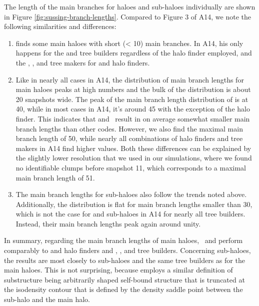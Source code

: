 The length of the main branches for haloes and sub-haloes individually are shown in Figure
\ref{fig:sussing-branch-lengths}. Compared to Figure 3 of A14, we note the following similarities
and differences:
%
\begin{enumerate}
	\item \acacia finds some main haloes with short (< 10) main branches.
		In A14, his only happens for the  and  tree builders
		regardless	of the halo finder employed, and the , ,
		and  tree makers for  and  halo finders.
%
	\item Like in nearly all cases in A14, the distribution of main branch lengths for
		main haloes peaks at high numbers and the bulk of the distribution is about 20 snapshots
		wide. The peak of the main branch length distribution of \acacia is at 40,
		while in most cases in A14, it's around 45 with the exception of the 
		halo finder. This indicates that \acacia and \phew\ result in on average
		somewhat smaller main branch lengths than other codes. However, we also find the
		maximal main branch length of 50, while nearly all combinations of
		halo finders and tree makers in A14 find higher values. Both these differences can be
		explained by the slightly lower resolution that we used in our simulations, where we
		found no identifiable clumps before snapshot 11, which corresponds to a maximal main
		branch length of 51.
%
	\item The main branch lengths for sub-haloes also follow the trends noted above. Additionally,
		the distribution is flat for main branch lengths smaller than 30, which is not the case
		for  and  sub-haloes in A14 for nearly all tree builders. Instead,
		their main branch lengths peak again around unity.
\end{enumerate}
%
In summary, regarding the main branch lengths of main haloes, \phew\ and \acacia perform
comparably to  and  halo finders and ,
, and  tree builders. Concerning sub-haloes, the results are
most closely to  sub-haloes and the same tree builders as for the main haloes. This
is not surprising, because  employs a similar definition of substructure being
arbitrarily shaped self-bound structure that is truncated at the isodensity contour that is
defined by the density saddle point between the sub-halo and the main halo.

